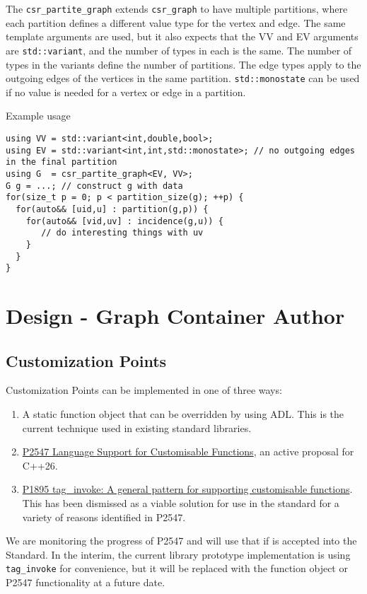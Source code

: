 \documentclass[10pt,onecolumn]{article}
\newcommand{\tcode}[1]{\lstinline[breaklines=true]{#1}}
\begin{document}
The \tcode{csr_partite_graph} extends \tcode{csr_graph} to have multiple partitions, where each partition defines a different value type for the vertex and edge. The same template arguments are used, but it also expects that the VV and EV arguments are \tcode{std::variant}, and the number of types in each is the same. The number of types in the variants define the number of partitions. The edge types apply to the outgoing edges of the vertices in the same partition. \tcode{std::monostate} can be used if no value is needed for a vertex or edge in a partition.

Example usage
\begin{lstlisting}
using VV = std::variant<int,double,bool>;
using EV = std::variant<int,int,std::monostate>; // no outgoing edges in the final partition
using G  = csr_partite_graph<EV, VV>;
G g = ...; // construct g with data
for(size_t p = 0; p < partition_size(g); ++p) {
  for(auto&& [uid,u] : partition(g,p)) {
    for(auto&& [vid,uv] : incidence(g,u)) {
       // do interesting things with uv
    }
  }
}
\end{lstlisting}

\section{Design - Graph Container Author}
\subsection{Customization Points}
Customization Points can be implemented in one of three ways:
\begin{enumerate}
\item A static function object that can be overridden by using ADL. This is the current technique used in existing standard libraries.
\item \href{https://wg21.link/P2547}{P2547 Language Support for Customisable Functions}, an active proposal for C++26.
\item \href{https://www.open-std.org/jtc1/sc22/wg21/docs/papers/2019/p1895r0.pdf}{P1895 tag\_invoke: A general pattern for supporting customisable functions}. This has been dismissed as a viable solution for use in the standard for a variety of reasons identified in P2547.
\end{enumerate}

We are monitoring the progress of P2547 and will use that if is accepted into the Standard. In the interim, the current library prototype implementation is using \tcode{tag_invoke} for convenience, but it will be replaced with the function object or P2547 functionality at a future date.
\end{document}
